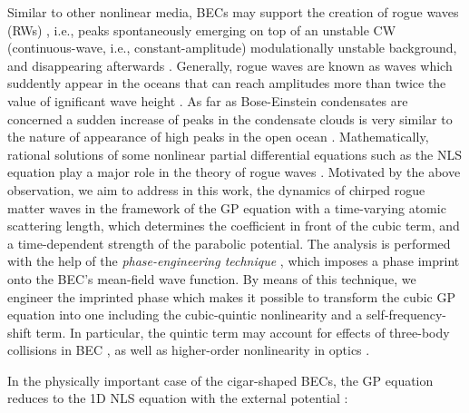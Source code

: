 \documentclass[preprintnumbers]{revtex4}
\begin{document}
Similar to other nonlinear media, BECs may support the creation of rogue
waves (RWs) \cite{Konotop}, i.e., peaks spontaneously emerging on top of an
unstable CW (continuous-wave, i.e., constant-amplitude) modulationally
unstable background, and disappearing afterwards \cite{mi1,mi2,mi3}.
Generally, rogue waves are known as waves which suddently appear in the
oceans that can reach amplitudes more than twice the value of ignificant
wave height \cite{jul1}. As far as Bose-Einstein condensates are concerned a
sudden increase of peaks in the condensate clouds is very similar to the
nature of appearance of high peaks in the open ocean \cite{jul1a}.
Mathematically, rational solutions of some nonlinear partial differential
equations such as the NLS equation play a major role in the theory of rogue
waves \cite{jul2}. Motivated by the above observation, we aim to address in
this work, the dynamics of chirped rogue matter waves in the framework of
the GP equation with a time-varying atomic scattering length, which
determines the coefficient in front of the cubic term, and a time-dependent
strength of the parabolic potential. The analysis is performed with the help
of the \textit{phase-engineering technique} \cite{17,we}, which imposes a
phase imprint onto the BEC's mean-field wave function. By means of this
technique, we engineer the imprinted phase which makes it possible to
transform the cubic GP equation into one including the cubic-quintic
nonlinearity and a self-frequency-shift term. In particular, the quintic
term may account for effects of three-body collisions in BEC \cite%
{20,quintic,17}, as well as higher-order nonlinearity in optics \cite%
{29,Reyna}.

In the physically important case of the cigar-shaped BECs, the GP equation
reduces to the 1D NLS equation with the external potential \cite{6,18}:
\end{document}
